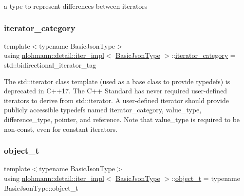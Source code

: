 a type to represent differences between iterators 

\mbox{\label{classnlohmann_1_1detail_1_1iter__impl_ad9e091f5c70b34b5b1abc1ab15fd9106}} 
\subsubsection{\texorpdfstring{iterator\+\_\+category}{iterator\_category}}
{\footnotesize\ttfamily template$<$typename Basic\+Json\+Type$>$ \\
using \hyperlink{classnlohmann_1_1detail_1_1iter__impl}{nlohmann\+::detail\+::iter\+\_\+impl}$<$ \hyperlink{classnlohmann_1_1detail_1_1iter__impl_abf18f18793f84b0222aebb5a2a87da7a}{Basic\+Json\+Type} $>$\+::\hyperlink{classnlohmann_1_1detail_1_1iter__impl_ad9e091f5c70b34b5b1abc1ab15fd9106}{iterator\+\_\+category} =  std\+::bidirectional\+\_\+iterator\+\_\+tag}

The std\+::iterator class template (used as a base class to provide typedefs) is deprecated in C++17. The C++ Standard has never required user-\/defined iterators to derive from std\+::iterator. A user-\/defined iterator should provide publicly accessible typedefs named iterator\+\_\+category, value\+\_\+type, difference\+\_\+type, pointer, and reference. Note that value\+\_\+type is required to be non-\/const, even for constant iterators. \mbox{\label{classnlohmann_1_1detail_1_1iter__impl_ab9a9598052e83fa14a2288e56d5dda7c}} 
\subsubsection{\texorpdfstring{object\+\_\+t}{object\_t}}
{\footnotesize\ttfamily template$<$typename Basic\+Json\+Type$>$ \\
using \hyperlink{classnlohmann_1_1detail_1_1iter__impl}{nlohmann\+::detail\+::iter\+\_\+impl}$<$ \hyperlink{classnlohmann_1_1detail_1_1iter__impl_abf18f18793f84b0222aebb5a2a87da7a}{Basic\+Json\+Type} $>$\+::\hyperlink{classnlohmann_1_1detail_1_1iter__impl_ab9a9598052e83fa14a2288e56d5dda7c}{object\+\_\+t} =  typename Basic\+Json\+Type\+::object\+\_\+t\hspace{0.3cm}{\ttfamily [private]}}

